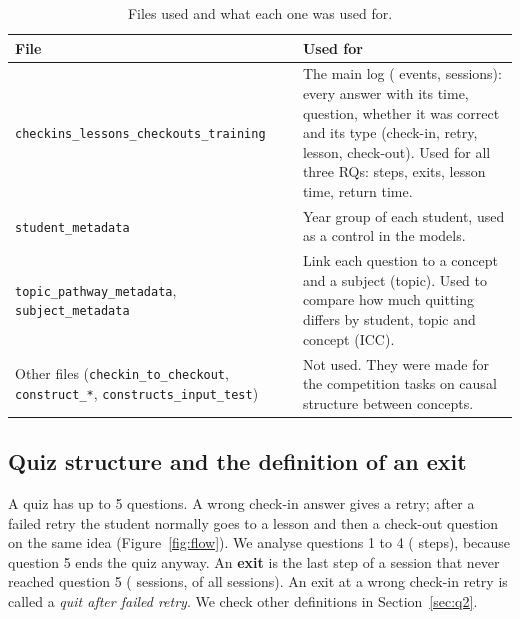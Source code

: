 \documentclass[11pt,a4paper]{article}
\begin{document}
\begin{table}[t]\centering\small
\caption{Files used and what each one was used for.}\label{tab:files}
\begin{tabular}{@{}>{\raggedright\arraybackslash}p{4.9cm}p{10.6cm}@{}}
\toprule
File & Used for\\\midrule
\texttt{checkins\_\allowbreak lessons\_\allowbreak checkouts\_\allowbreak training} & The main log (\nEventsRaw{} events, \nSessions{} sessions): every answer with its time, question, whether it was correct and its type (check-in, retry, lesson, check-out). Used for all three RQs: steps, exits, lesson time, return time.\\
\texttt{student\_metadata} & Year group of each student, used as a control in the models.\\
\texttt{topic\_pathway\_\allowbreak metadata}, \texttt{subject\_\allowbreak metadata} & Link each question to a concept and a subject (topic). Used to compare how much quitting differs by student, topic and concept (ICC).\\
Other files (\texttt{checkin\_to\_\allowbreak checkout}, \texttt{construct\_*}, \texttt{constructs\_\allowbreak input\_test}) & Not used. They were made for the competition tasks on causal structure between concepts.\\
\bottomrule\end{tabular}\end{table}

\subsection{Quiz structure and the definition of an exit}
A quiz has up to 5 questions. A wrong check-in answer gives a retry; after a failed retry the student normally goes to a lesson and then a check-out question on the same idea (Figure~\ref{fig:flow}). We analyse questions 1 to 4 (\nEventsScope{} steps), because question 5 ends the quiz anyway. An \textbf{exit} is the last step of a session that never reached question 5 (\nExits{} sessions, \sessionExitRate{} of all sessions). An exit at a wrong check-in retry is called a \emph{quit after failed retry}. We check other definitions in Section~\ref{sec:q2}.
\end{document}
